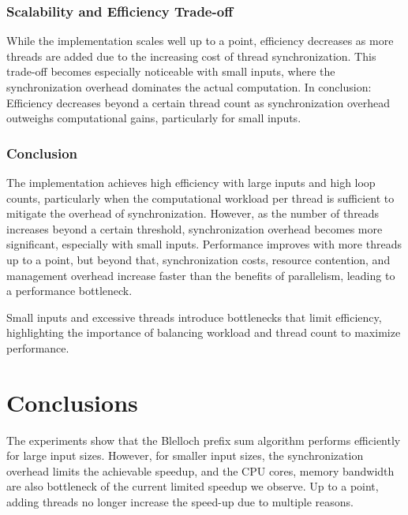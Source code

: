 \documentclass[letterpaper,12pt]{article}
\theoremstyle{remark}
\begin{document}
\subsubsection{Scalability and Efficiency Trade-off}
While the implementation scales well up to a point, efficiency decreases as more threads are added due to the increasing cost of thread synchronization. This trade-off becomes especially noticeable with small inputs, where the synchronization overhead dominates the actual computation.
In conclusion:
Efficiency decreases beyond a certain thread count as synchronization overhead outweighs computational gains, particularly for small inputs.\\

\subsubsection{Conclusion}
The implementation achieves high efficiency with large inputs and high loop counts, particularly when the computational workload per thread is sufficient to mitigate the overhead of synchronization. However, as the number of threads increases beyond a certain threshold, synchronization overhead becomes more significant, especially with small inputs. Performance improves with more threads up to a point, but beyond that, synchronization costs, resource contention, and management overhead increase faster than the benefits of parallelism, leading to a performance bottleneck.

Small inputs and excessive threads introduce bottlenecks that limit efficiency, highlighting the importance of balancing workload and thread count to maximize performance.




 


\section*{Conclusions}

The experiments show that the Blelloch prefix sum algorithm performs efficiently for large input sizes. However, for smaller input sizes, the synchronization overhead limits the achievable speedup, and the CPU cores, memory bandwidth are also bottleneck of the current limited speedup we observe. Up to a point, adding threads no longer increase the speed-up due to multiple reasons.


  
\end{document}
